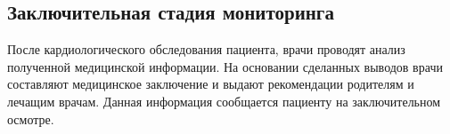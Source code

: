 \subsection{Заключительная стадия мониторинга}

После кардиологического обследования пациента, врачи проводят анализ полученной
медицинской информации. На основании сделанных выводов врачи составляют
медицинское заключение и выдают рекомендации родителям и лечащим врачам. Данная
информация сообщается пациенту на заключительном осмотре.